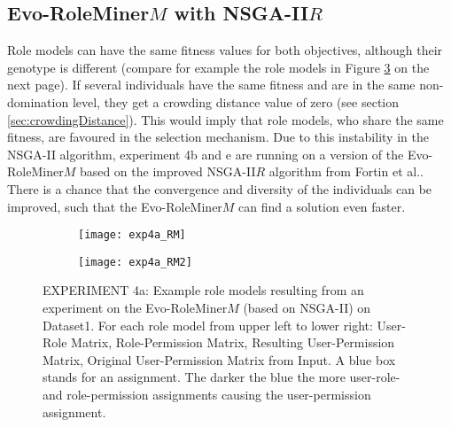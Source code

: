 \subsection{Evo-RoleMiner$M$ with NSGA-II$R$}
Role models can have the same fitness values for both objectives, although their genotype is different (compare for example the role models in Figure \ref{fig:exp4a_RM_compare} on the next page). If several individuals have the same fitness and are in the same non-domination level, they get a crowding distance value of zero (see section \ref{sec:crowdingDistance}). This would imply that role models, who share the same fitness, are favoured in the selection mechanism. Due to this instability in the NSGA-II algorithm, experiment 4b and e are running on a version of the Evo-RoleMiner$M$ based on the improved NSGA-II$R$ algorithm from Fortin et al.\cite{Fortin:2013}. There is a chance that the convergence and diversity of the individuals can be improved, such that the Evo-RoleMiner$M$ can find a solution even faster.

\begin{figure}[H]
	\centering
	\begin{subfigure}[b]{0.5\textwidth}
		\texttt{[image: exp4a\_RM]}
		\caption{}
		\label{fig:exp4a_RM}
	\end{subfigure}%
	\begin{subfigure}[b]{0.5\textwidth}
		\texttt{[image: exp4a\_RM2]}
		\caption{}
		\label{fig:exp4a_RM2}
	\end{subfigure}
	\caption{EXPERIMENT 4a: Example role models resulting from an experiment on the Evo-RoleMiner$M$ (based on NSGA-II) on Dataset1. For each role model from upper left to lower right: User-Role Matrix, Role-Permission Matrix, Resulting User-Permission Matrix, Original User-Permission Matrix from Input. A blue box stands for an assignment. The darker the blue the more user-role- and role-permission assignments causing the user-permission assignment.}
	\label{fig:exp4a_RM_compare}
\end{figure}

